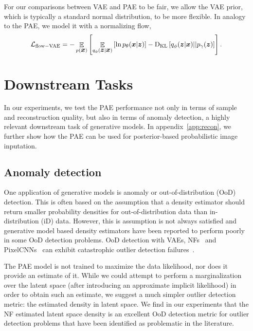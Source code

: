 \documentclass[10pt]{article} \usepackage[accepted]{tmlr}
\DeclareMathOperator{\EE}{\mathbb{E}}
\def\bi#1{\hbox{\boldmath{$#1$}}}
\begin{document}
For our comparisons between VAE and PAE to be fair, we allow the VAE prior, which is typically a standard normal distribution, to be more flexible. In analogy to the PAE, we model it with a normalizing flow,
\begin{equation}
\label{eq:flow-VAE}
\mathcal{L}_{\mathrm{flow-VAE}} = - \EE_{p({\bi{x}})}\left[\EE_{q_{\phi}(\bi{z}|\bi x)}\left[\ln p_\theta(\bi x|\bi z) \right]- \mathrm{D}_\mathrm{KL}\left[q_\phi(\bi z|\bi x)||p_\gamma(\bi z)\right]\right].
\end{equation}


\section{Downstream Tasks}
In our experiments, we test the PAE performance not only in terms of sample and reconstruction quality, but also in terms of anomaly detection, a highly relevant downstream task of generative models. In appendix~\ref{app:recon}, we further show how the PAE can be used for posterior-based probabilistic image inputation.  

\subsection{Anomaly detection}
\label{sec:ood-detector}
One application of generative models is anomaly or out-of-distribution (OoD) detection. This is often based on the assumption that a density estimator should return smaller probability densities for out-of-distribution data than in-distribution (iD) data. However, this is assumption is not always satisfied and generative model based density estimators have been reported to perform poorly in some OoD detection problems. OoD detection with VAEs, NFs~\citep{glow} and PixelCNNs~\citep{OordKEKVG16} can exhibit catastrophic outlier detection failures~\citep{Nalisnick2019}.

The PAE model is not trained to maximize the data likelihood, nor does it provide an estimate of it. While we could attempt to perform a marginalization over the latent space (after introducing an approximate implicit likelihood) in order to obtain such an estimate, we suggest a much simpler outlier detection metric: the estimated density in latent space. We find in our experiments that the NF estimated latent space density is an excellent OoD detection metric for outlier detection problems that have been identified as problematic in the literature.
\end{document}

